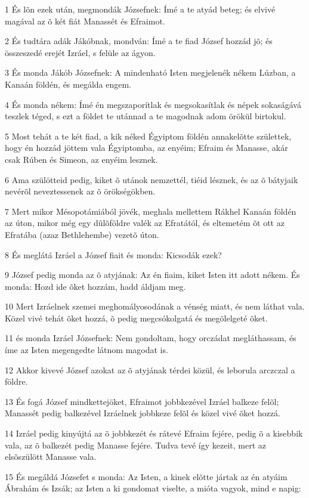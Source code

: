 \par 1 És lõn ezek után, megmondák Józsefnek: Ímé a te atyád beteg; és elvivé magával az õ két fiát Manassét és Efraimot.
\par 2 És tudtára adák Jákóbnak, mondván: Ímé a te fiad József hozzád jõ; és összeszedé erejét Izráel, s felüle az ágyon.
\par 3 És monda Jákób Józsefnek: A mindenható Isten megjelenék nékem Lúzban, a Kanaán földén, és megálda engem.
\par 4 És monda nékem: Ímé én megszaporítlak és megsokasítlak és népek sokaságává teszlek téged, s ezt a földet te utánnad a te magodnak  adom örökül birtokul.
\par 5 Most tehát a te két fiad, a kik néked Égyiptom földén annakelõtte születtek, hogy én hozzád jöttem vala Égyiptomba, az enyéim; Efraim és Manasse, akár csak Rúben és Simeon, az enyéim lesznek.
\par 6 Ama szülötteid pedig, kiket õ utánok nemzettél, tiéid lésznek, és az õ bátyjaik nevérõl neveztessenek az õ örökségökben.
\par 7 Mert mikor Mésopotámiából jövék, meghala mellettem Rákhel Kanaán földén az úton, mikor még egy dûlõföldre valék az Efratától, és eltemetém õt ott az Efratába (azaz Bethlehembe) vezetõ úton.
\par 8 És meglátá Izráel a József fiait és monda: Kicsodák ezek?
\par 9 József pedig monda az õ atyjának: Az én fiaim, kiket Isten itt adott nékem. És monda: Hozd ide õket hozzám, hadd áldjam meg.
\par 10 Mert Izráelnek szemei meghomályosodának a vénség miatt, és nem láthat vala. Közel vivé tehát õket hozzá, õ pedig megcsókolgatá és megölelgeté õket.
\par 11 és monda Izráel Józsefnek: Nem gondoltam, hogy orczádat megláthassam, és íme az Isten megengedte látnom magodat is.
\par 12 Akkor kivevé József azokat az õ atyjának térdei közül, és leborula arczczal a földre.
\par 13 És fogá József mindkettejöket, Efraimot jobbkezével Izráel balkeze felõl; Manassét pedig balkezével Izráelnek jobbkeze felõl és közel vivé õket hozzá.
\par 14 Izráel pedig kinyújtá az õ jobbkezét és rátevé Efraim fejére, pedig õ a kisebbik vala, az õ balkezét pedig Manasse fejére. Tudva tevé így kezeit, mert az elsõszülött Manasse vala.
\par 15 És megáldá Józsefet s monda: Az Isten, a kinek elõtte jártak az én atyáim Ábrahám és Izsák; az Isten a ki gondomat viselte, a mióta vagyok, mind e napig:
